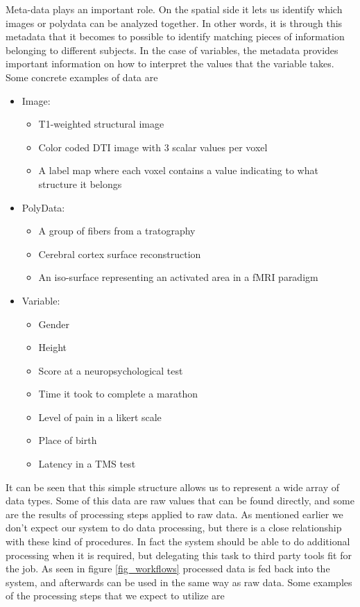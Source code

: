 Meta-data plays an important role. On the spatial side it lets us identify which images or polydata can be analyzed together. In other words, it is through this metadata that it becomes to possible to identify matching pieces of information belonging to different subjects. In the case of variables, the metadata provides important information on how to interpret the values that the variable takes. Some concrete examples of data are
\begin{itemize}
\item Image:
\begin{itemize}
\item T1-weighted structural image
\item Color coded DTI image with 3 scalar values per voxel
\item A label map where each voxel contains a value indicating to what structure it belongs 
\end{itemize}
\item PolyData:
\begin{itemize}
\item A group of fibers from a tratography
\item Cerebral cortex surface reconstruction
\item An iso-surface representing an activated area in a fMRI paradigm
\end{itemize}
\item Variable:
\begin{itemize}
\item Gender
\item Height
\item Score at a neuropsychological test
\item Time it took to complete a marathon
\item Level of pain in a likert scale
\item Place of birth
\item Latency in a TMS test
\end{itemize}
\end{itemize}


It can be seen that this simple structure allows us to represent a wide array of data types. Some of this data are raw values that can be found directly, and some are the results of processing steps applied to raw data. As mentioned earlier we don't expect our system to do data processing, but there is a close relationship with these kind of procedures. In fact the system should be able to do additional processing when it is required, but delegating this task to third party tools fit for the job. As seen in figure \ref{fig_workflows} processed data is fed back into the system, and afterwards can be used in the same way as raw data. Some examples of the processing steps that we expect to utilize are

